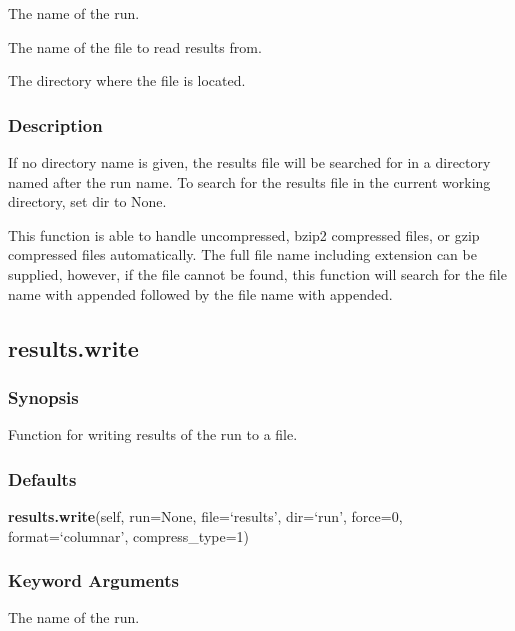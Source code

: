   The name of the run. 

  The name of the file to read results from. 

  The directory where the file is located. 




\subsubsection{Description}

If no directory name is given, the results file will be searched for in a directory named after the run name.  To search for the results file in the current working directory, set dir to None.


This function is able to handle uncompressed, bzip2 compressed files, or gzip compressed files automatically.  The full file name including extension can be supplied, however, if the file cannot be found, this function will search for the file name with  appended followed by the file name with  appended.




\newpage

\subsection{results.write}


\subsubsection{Synopsis}

Function for writing results of the run to a file.



\subsubsection{Defaults}

\textsf{\textbf{results.write}(self, run=None, file=`results', dir=`run', force=0, format=`columnar', compress\_type=1)}


\subsubsection{Keyword Arguments}

  The name of the run. 

